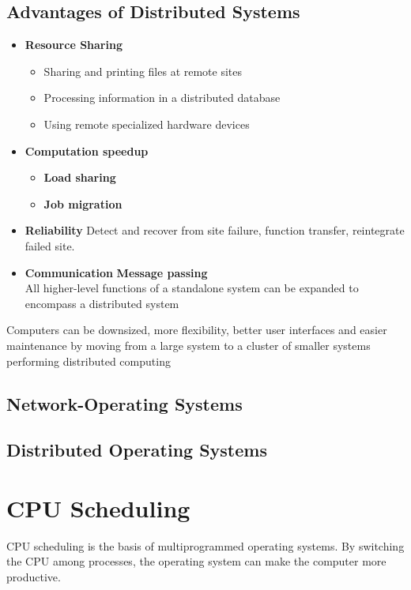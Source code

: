 \documentclass{book/custombook}
\begin{document}
        \section{Advantages of Distributed Systems}
            \begin{itemize}
                \item \textbf{Resource Sharing}
                    \begin{itemize}
                        \item Sharing and printing files at remote sites
                        \item Processing information in a distributed database
                        \item Using remote specialized hardware devices
                    \end{itemize}
                \item \textbf{Computation speedup}
                    \begin{itemize}
                        \item \textbf{Load sharing}
                        \item \textbf{Job migration}
                    \end{itemize}
                \item \textbf{Reliability}
                    \subitem Detect and recover from site failure, function transfer,
                    reintegrate failed site.
                \item \textbf{Communication}
                    \subitem \textbf{Message passing}\\
                    \indent \indent All higher-level functions of a standalone system can
                    be expanded to encompass a distributed system
            \end{itemize}
            Computers can be downsized, more flexibility, better user interfaces and easier
            maintenance by moving from a large system to a cluster of smaller systems performing
            distributed computing
        \section{Network-Operating Systems}
        \section{Distributed Operating Systems}
    \chapter{CPU Scheduling}
        CPU scheduling is the basis of multiprogrammed operating systems.
        By switching the CPU among processes, the operating system can make the
        computer more productive.
\end{document}
